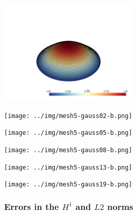 \documentclass[
  11pt,
]{article}
\let\origfigure\figure
\let\endorigfigure\endfigure
\renewenvironment{figure}[1][2] {
    \expandafter\origfigure\expandafter[H]
} {
    \endorigfigure
}
\begin{document}
\begin{figure}
\centering
\includegraphics[width=0.5\textwidth,height=\textheight]{../img/mesh4-gauss19-b.png}
\caption{Finite element solution for problem 1 over mesh number 4 and
order-19 numerical integration.}
\end{figure}

\begin{figure}
\centering
\texttt{[image: ../img/mesh5-gauss02-b.png]}
\caption{Finite element solution for problem 1 over mesh number 5 and
order-2 numerical integration.}
\end{figure}

\begin{figure}
\centering
\texttt{[image: ../img/mesh5-gauss05-b.png]}
\caption{Finite element solution for problem 1 over mesh number 5 and
order-5 numerical integration.}
\end{figure}

\begin{figure}
\centering
\texttt{[image: ../img/mesh5-gauss08-b.png]}
\caption{Finite element solution for problem 1 over mesh number 5 and
order-8 numerical integration.}
\end{figure}

\begin{figure}
\centering
\texttt{[image: ../img/mesh5-gauss13-b.png]}
\caption{Finite element solution for problem 1 over mesh number 5 and
order-13 numerical integration.}
\end{figure}

\begin{figure}
\centering
\texttt{[image: ../img/mesh5-gauss19-b.png]}
\caption{Finite element solution for problem 1 over mesh number 5 and
order-19 numerical integration.}
\end{figure}

\hypertarget{errors-in-the-h1-and-l2-norms}{%
\subsubsection{\texorpdfstring{Errors in the \(H^1\) and \(L2\)
norms}{Errors in the H\^{}1 and L2 norms}}\label{errors-in-the-h1-and-l2-norms}}
\end{document}
